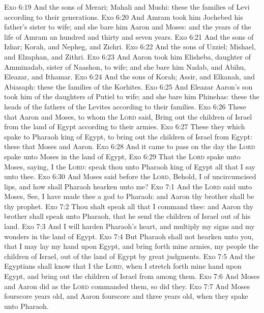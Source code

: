 \vs Exo 6:19 And the sons of Merari; Mahali and Mushi: these  the families of Levi according to their generations.
\vs Exo 6:20 And Amram took him Jochebed his father's sister to wife; and she bare him Aaron and Moses: and the years of the life of Amram  an hundred and thirty and seven years.
\vs Exo 6:21 And the sons of Izhar; Korah, and Nepheg, and Zichri.
\vs Exo 6:22 And the sons of Uzziel; Mishael, and Elzaphan, and Zithri.
\vs Exo 6:23 And Aaron took him Elisheba, daughter of Amminadab, sister of Naashon, to wife; and she bare him Nadab, and Abihu, Eleazar, and Ithamar.
\vs Exo 6:24 And the sons of Korah; Assir, and Elkanah, and Abiasaph: these  the families of the Korhites.
\vs Exo 6:25 And Eleazar Aaron's son took him  of the daughters of Putiel to wife; and she bare him Phinehas: these  the heads of the fathers of the Levites according to their families.
\vs Exo 6:26 These  that Aaron and Moses, to whom the \textsc{Lord} said, Bring out the children of Israel from the land of Egypt according to their armies.
\vs Exo 6:27 These  they which spake to Pharaoh king of Egypt, to bring out the children of Israel from Egypt: these  that Moses and Aaron.
\vs Exo 6:28 And it came to pass on the day  the \textsc{Lord} spake unto Moses in the land of Egypt,
\vs Exo 6:29 That the \textsc{Lord} spake unto Moses, saying, I  the \textsc{Lord}: speak thou unto Pharaoh king of Egypt all that I say unto thee.
\vs Exo 6:30 And Moses said before the \textsc{Lord}, Behold, I  of uncircumcised lips, and how shall Pharaoh hearken unto me?
\vs Exo 7:1 And the \textsc{Lord} said unto Moses, See, I have made thee a god to Pharaoh: and Aaron thy brother shall be thy prophet.
\vs Exo 7:2 Thou shalt speak all that I command thee: and Aaron thy brother shall speak unto Pharaoh, that he send the children of Israel out of his land.
\vs Exo 7:3 And I will harden Pharaoh's heart, and multiply my signs and my wonders in the land of Egypt.
\vs Exo 7:4 But Pharaoh shall not hearken unto you, that I may lay my hand upon Egypt, and bring forth mine armies,  my people the children of Israel, out of the land of Egypt by great judgments.
\vs Exo 7:5 And the Egyptians shall know that I  the \textsc{Lord}, when I stretch forth mine hand upon Egypt, and bring out the children of Israel from among them.
\vs Exo 7:6 And Moses and Aaron did as the \textsc{Lord} commanded them, so did they.
\vs Exo 7:7 And Moses  fourscore years old, and Aaron fourscore and three years old, when they spake unto Pharaoh.
